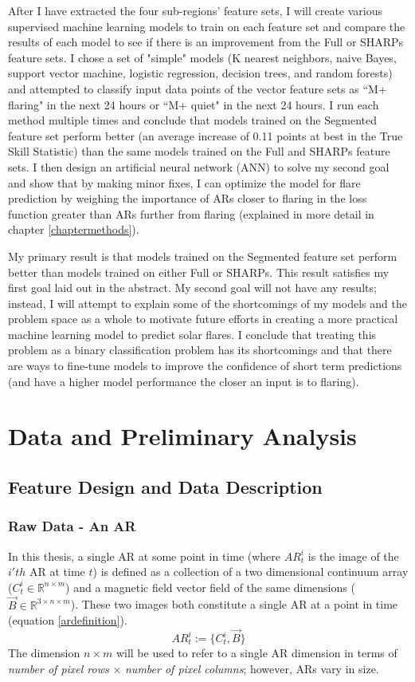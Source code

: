 \documentclass[defaultstyle,11pt]{thesis}
\begin{document}
After I have extracted the four sub-regions' feature sets, I will create various supervised machine learning models to train on each feature set and compare the results of each model to see if there is an improvement from the Full or SHARPs feature sets. I chose a set of "simple" models (K nearest neighbors, naive Bayes, support vector machine, logistic regression, decision trees, and random forests) and attempted to classify input data points of the vector feature sets as ``M+ flaring" in the next 24 hours or ``M+ quiet" in the next 24 hours. I run each method multiple times and conclude that models trained on the Segmented feature set perform better (an average increase of 0.11 points at best in the True Skill Statistic) than the same models trained on the Full and SHARPs feature sets. I then design an artificial neural network (ANN) to solve my second goal and show that by making minor fixes, I can optimize the model for flare prediction by weighing the importance of ARs closer to flaring in the loss function greater than ARs further from flaring (explained in more detail in chapter \ref{chaptermethods}).

My primary result is that models trained on the Segmented feature set perform better than models trained on either Full or SHARPs. This result satisfies my first goal laid out in the abstract. My second goal will not have any results; instead, I will attempt to explain some of the shortcomings of my models and the problem space as a whole to motivate future efforts in creating a more practical machine learning model to predict solar flares. I conclude that treating this problem as a binary classification problem has its shortcomings and that there are ways to fine-tune models to improve the confidence of short term predictions (and have a higher model performance the closer an input is to flaring).

\chapter{Data and Preliminary Analysis}
\label{chp:data}

\section{Feature Design and Data Description}
\subsection{Raw Data - An AR}
\label{activeregion}
In this thesis, a single AR at some point in time (where $AR^i_t$ is the image of the $i'th$ AR at time $t$) is defined as a collection of a two dimensional continuum array ($C^i_t \in \mathbb{R}^{n\times m}$) and a magnetic field vector field of the same dimensions ($\vec{B} \in \mathbb{R}^{3 \times n\times m}$). These two images both constitute a single AR at a point in time (equation \ref{ardefinition}).
\begin{equation}
AR_t^i := \{C^i_t, \vec{B}\}
\label{ardefinition}
\end{equation}
The dimension $n\times m$ will be used to refer to a single AR dimension in terms of \textit{number of pixel rows} $\times$ \textit{number of pixel columns}; however, ARs vary in size.
\end{document}
